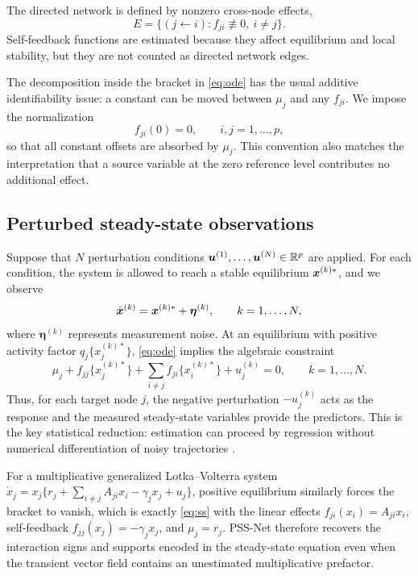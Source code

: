 The directed network is defined by nonzero cross-node effects,
\begin{equation}
  E = \{(j\leftarrow i): f_{ji}\not\equiv 0,\ i\neq j\}.
  \label{eq:edge}
\end{equation}
Self-feedback functions are estimated because they affect equilibrium and local
stability, but they are not counted as directed network edges.

The decomposition inside the bracket in \eqref{eq:ode} has the usual additive
identifiability issue:
a constant can be moved between $\mu_j$ and any $f_{ji}$.  We impose the
normalization
\begin{equation}
  f_{ji}(0)=0,\qquad i,j=1,\ldots,p,
  \label{eq:zero}
\end{equation}
so that all constant offsets are absorbed by $\mu_j$.  This convention also
matches the interpretation that a source variable at the zero reference level
contributes no additional effect.

\subsection{Perturbed steady-state observations}
\label{sec:method:pss}

Suppose that $N$ perturbation conditions
$\bm{u}^{(1)},\ldots,\bm{u}^{(N)}\in\mathbb{R}^p$ are applied.  For each condition, the system
is allowed to reach a stable equilibrium $\bm{x}^{(k)*}$, and we observe
\begin{equation}
  \tilde{\bm{x}}^{(k)} = \bm{x}^{(k)*} + \bm{\eta}^{(k)},
  \qquad k=1,\ldots,N,
  \label{eq:obs}
\end{equation}
where $\bm{\eta}^{(k)}$ represents measurement noise.  At an equilibrium with
positive activity factor $q_j\{x_j^{(k)*}\}$, \eqref{eq:ode} implies the
algebraic constraint
\begin{equation}
  \mu_j
  + f_{jj}\{x_j^{(k)*}\}
  + \sum_{i\neq j} f_{ji}\{x_i^{(k)*}\}
  + u_j^{(k)}
  = 0,
  \qquad k=1,\ldots,N.
  \label{eq:ss}
\end{equation}
Thus, for each target node $j$, the negative perturbation $-u_j^{(k)}$ acts as
the response and the measured steady-state variables provide the predictors.
This is the key statistical reduction: estimation can proceed by regression
without numerical differentiation of noisy trajectories
\citep{meister2013pss,henderson2014network,wu2014saode}.

For a multiplicative generalized Lotka--Volterra system
$\dot x_j = x_j\{r_j+\sum_{i\neq j}A_{ji}x_i-\gamma_j x_j+u_j\}$, positive
equilibrium similarly forces the bracket to vanish, which is exactly
\eqref{eq:ss} with the linear effects $f_{ji}(x_i)=A_{ji}x_i$, self-feedback
$f_{jj}(x_j)=-\gamma_j x_j$, and $\mu_j=r_j$.  PSS-Net therefore recovers the
interaction signs and supports encoded in the steady-state equation even when
the transient vector field contains an unestimated multiplicative prefactor.

